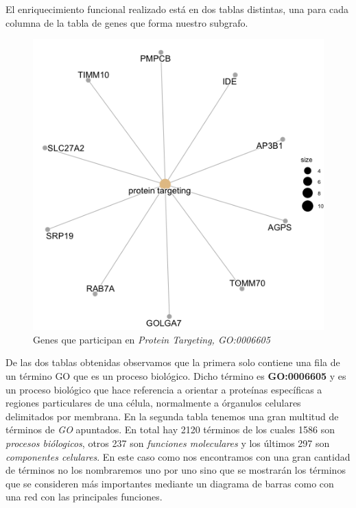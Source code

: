 El enriquecimiento funcional realizado est\'a en dos tablas distintas, una para cada columna de la tabla de genes que forma nuestro subgrafo.\newline
\begin{figure}[ht!]
	\centering
	\includegraphics[scale = 0.2]{figures/GenesProteinTargeting.png}
	\caption{Genes que participan en \textit{Protein Targeting, GO:0006605}}
\end{figure}
De las dos tablas obtenidas observamos que la primera solo contiene una fila de un t\'ermino GO que es un proceso biol\'ogico. Dicho t\'ermino es \textbf{GO:0006605} y es un proceso biol\'ogico que hace referencia a orientar a prote\'inas espec\'ificas a regiones particulares de una c\'elula, normalmente a \'organulos celulares delimitados por membrana.
En la segunda tabla tenemos una gran multitud de t\'erminos de \textit{GO} apuntados. En total hay 2120 t\'erminos de los cuales 1586 son \textit{procesos bi\'ologicos}, otros 237 son \textit{funciones moleculares} y los \'ultimos 297 son \textit{componentes celulares}.\newline
En este caso como nos encontramos con una gran cantidad de t\'erminos no los nombraremos uno por uno sino que se mostrar\'an los t\'erminos que se consideren m\'as importantes mediante un diagrama de barras como con una red con las principales funciones. \newline
